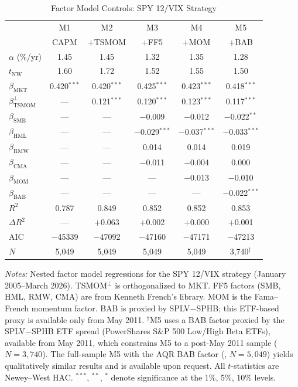 \begin{table}[H]
\centering
\begin{threeparttable}
\caption{Factor Model Controls: SPY 12/VIX Strategy}
\label{tab:ff5}
\small
\begin{tabular}{@{}lccccc@{}}
\toprule
& M1 & M2 & M3 & M4 & M5 \\
& CAPM & +TSMOM & +FF5 & +MOM & +BAB \\
\midrule
$\alpha$ (\%/yr) & 1.45 & 1.45 & 1.32 & 1.35 & 1.28 \\
$t_{\text{NW}}$ & 1.60 & 1.72 & 1.52 & 1.55 & 1.50 \\
\midrule
$\beta_{\text{MKT}}$ & 0.420$^{***}$ & 0.420$^{***}$ & 0.425$^{***}$ & 0.423$^{***}$ & 0.418$^{***}$ \\
$\beta_{\text{TSMOM}}^{\perp}$ & --- & 0.121$^{***}$ & 0.120$^{***}$ & 0.123$^{***}$ & 0.117$^{***}$ \\
$\beta_{\text{SMB}}$ & --- & --- & $-$0.009 & $-$0.012 & $-$0.022$^{**}$ \\
$\beta_{\text{HML}}$ & --- & --- & $-$0.029$^{***}$ & $-$0.037$^{***}$ & $-$0.033$^{***}$ \\
$\beta_{\text{RMW}}$ & --- & --- & 0.014 & 0.014 & 0.019 \\
$\beta_{\text{CMA}}$ & --- & --- & $-$0.011 & $-$0.004 & 0.000 \\
$\beta_{\text{MOM}}$ & --- & --- & --- & $-$0.013 & $-$0.010 \\
$\beta_{\text{BAB}}$ & --- & --- & --- & --- & $-$0.022$^{***}$ \\
\midrule
$R^2$ & 0.787 & 0.849 & 0.852 & 0.852 & 0.853 \\
$\Delta R^2$ & --- & +0.063 & +0.002 & +0.000 & +0.001 \\
AIC & $-$45339 & $-$47092 & $-$47160 & $-$47171 & $-$47213 \\
$N$ & 5,049 & 5,049 & 5,049 & 5,049 & 3,740$^{\dagger}$ \\
\bottomrule
\end{tabular}
\begin{tablenotes}
\small
\item \textit{Notes:} Nested factor model regressions for the SPY 12/VIX strategy (January 2005--March 2026). TSMOM$^{\perp}$ is orthogonalized to MKT. FF5 factors (SMB, HML, RMW, CMA) are from Kenneth French's library. MOM is the Fama--French momentum factor. BAB is proxied by SPLV$-$SPHB; this ETF-based proxy is available only from May 2011. $^{\dagger}$M5 uses a BAB factor proxied by the SPLV$-$SPHB ETF spread (PowerShares S\&P 500 Low/High Beta ETFs), available from May 2011, which constrains M5 to a post-May 2011 sample ($N = 3{,}740$). The full-sample M5 with the AQR BAB factor (, $N = 5{,}049$) yields qualitatively similar results and is available upon request. All $t$-statistics are Newey--West HAC. $^{***}$, $^{**}$, $^{*}$ denote significance at the 1\%, 5\%, 10\% levels.
\end{tablenotes}
\end{threeparttable}
\end{table}


